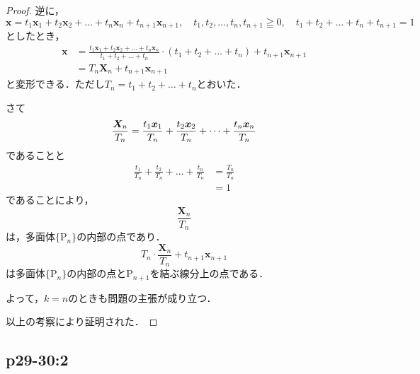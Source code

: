 \documentclass[uplatex,dvipdfmx,a4paper,11pt,fleqn]{jsarticle}
\begin{document}
\begin{leftbar}
\begin{proof}
    逆に，
    \[
        \bm{x} = t_1 \bm{x}_1 + t_2 \bm{x}_2 + \dots + t_n \bm{x}_n + t_{n+1} \bm{x}_{n+1} , \quad t_1, t_2 ,\dots , t_n,t_{n+1} \geqq 0 ,\quad  t_1 +t_2 + \dots+t_n + t_{n+1} =1
    \]
    としたとき，
    \begin{align*}
        \bm{x} &=\frac{t_1 \bm{x}_1 + t_2 \bm{x}_2+\dots+ t_n \bm{x}_n}{t_1+t_2+\dots+t_n} \cdot (t_1+t_2+\dots+t_n) +t_{n+1} \bm{x}_{n+1} \\
        & = T_n \bm{X}_n + t_{n+1} \bm{x}_{n+1}
    \end{align*}
    と変形できる．ただし$T_n = t_1 + t_2 +\dots+t_n$とおいた．
    
    さて
    \[
        \frac{\bm{X}_n }{T_n} = \frac{t_1 \bm{x}_1 }{T_n}+ \frac{t_2 \bm{x}_2 }{T_n}+\dots +  \frac{t_n \bm{x}_n }{T_n}  \\
    \]
    であることと
    \begin{align*}
        \frac{t_1}{T_n}+\frac{t_2 }{T_n} +\dots +\frac{t_n }{T_n}& = \frac{T_n}{T_n} \\
        & = 1
    \end{align*}
    であることにより，
    \[
        \frac{\bm{X}_n}{T_n}
    \]
    は，多面体$\{ \mathrm{P}_n \}$の内部の点であり．
    \[
        T_n \cdot \frac{\bm{X}_n}{T_n} + t_{n+1} \bm{x}_{n+1}
    \]
    は多面体$\{ \mathrm{P}_n \}$の内部の点と$\mathrm{P}_{n+1}$を結ぶ線分上の点である．

    よって，$k=n$のときも問題の主張が成り立つ．

    以上の考察により証明された．
\end{proof}
\end{leftbar}

\subsection*{p29-30:2}
\end{document}
